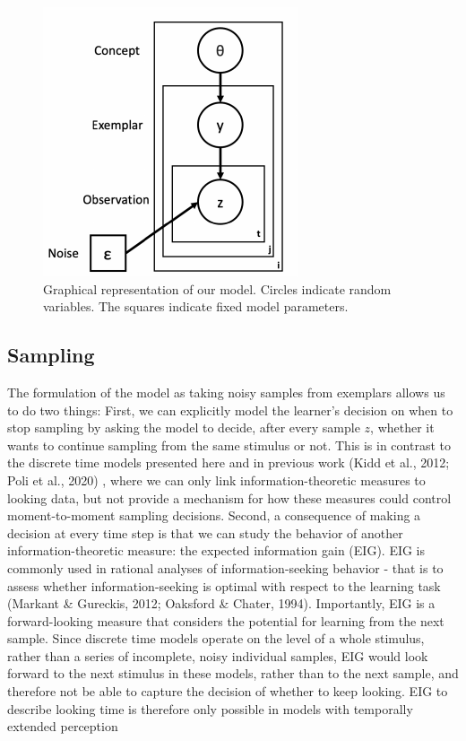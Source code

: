 \documentclass[10pt, letterpaper]{article}
\newenvironment{CodeChunk}{}{}
\begin{document}
\begin{CodeChunk}
\begin{figure}[H]

{\centering \includegraphics{figs/plate_diagram-1} 

}

\caption[Graphical representation of our model]{Graphical representation of our model. Circles indicate random variables. The squares indicate fixed model parameters.}\label{fig:plate_diagram}
\end{figure}
\end{CodeChunk}

\hypertarget{sampling}{%
\subsection{Sampling}\label{sampling}}

The formulation of the model as taking noisy samples from exemplars
allows us to do two things: First, we can explicitly model the learner's
decision on when to stop sampling by asking the model to decide, after
every sample \(z\), whether it wants to continue sampling from the same
stimulus or not. This is in contrast to the discrete time models
presented here and in previous work (Kidd et al., 2012; Poli et al.,
2020) , where we can only link information-theoretic measures to looking
data, but not provide a mechanism for how these measures could control
moment-to-moment sampling decisions. Second, a consequence of making a
decision at every time step is that we can study the behavior of another
information-theoretic measure: the expected information gain (EIG). EIG
is commonly used in rational analyses of information-seeking behavior -
that is to assess whether information-seeking is optimal with respect to
the learning task (Markant \& Gureckis, 2012; Oaksford \& Chater, 1994).
Importantly, EIG is a forward-looking measure that considers the
potential for learning from the next sample. Since discrete time models
operate on the level of a whole stimulus, rather than a series of
incomplete, noisy individual samples, EIG would look forward to the next
stimulus in these models, rather than to the next sample, and therefore
not be able to capture the decision of whether to keep looking. EIG to
describe looking time is therefore only possible in models with
temporally extended perception
\end{document}
